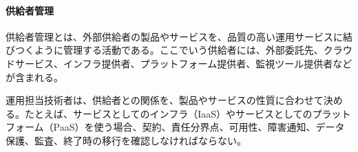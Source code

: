 \paragraph{供給者管理}

供給者管理とは、外部供給者の製品やサービスを、品質の高い運用サービスに結びつくように管理する活動である。ここでいう供給者には、外部委託先、クラウドサービス、インフラ提供者、プラットフォーム提供者、監視ツール提供者などが含まれる。

運用担当技術者は、供給者との関係を、製品やサービスの性質に合わせて決める。たとえば、サービスとしてのインフラ（IaaS）やサービスとしてのプラットフォーム（PaaS）を使う場合、契約、責任分界点、可用性、障害通知、データ保護、監査、終了時の移行を確認しなければならない。
